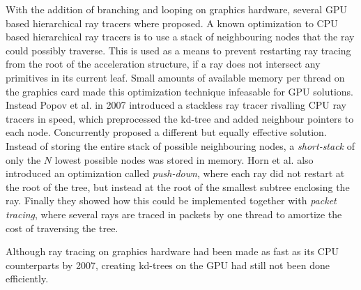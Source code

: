 With the addition of branching and looping on graphics hardware, several GPU
based hierarchical ray tracers where proposed. A known optimization to CPU based
hierarchical ray tracers is to use a stack of neighbouring nodes that the ray
could possibly traverse. This is used as a means to prevent restarting ray
tracing from the root of the acceleration structure, if a ray does not intersect
any primitives in its current leaf. Small amounts of available memory per thread
on the graphics card made this optimization technique infeasable for GPU
solutions. Instead Popov et al. in 2007 introduced a
stackless ray tracer rivalling CPU ray tracers in speed, which preprocessed the
kd-tree and added neighbour pointers to each node. Concurrently \horn{} proposed
a different but equally effective solution. Instead of storing the entire stack
of possible neighbouring nodes, a \textit{short-stack} of only the $N$ lowest
possible nodes was stored in memory. Horn et al. also introduced an optimization
called \textit{push-down}, where each ray did not restart at the root of the
tree, but instead at the root of the smallest subtree enclosing the ray. Finally
they showed how this could be implemented together with \textit{packet tracing},
where several rays are traced in packets by one thread to amortize the cost of
traversing the tree.




Although ray tracing on graphics hardware had been made as fast as its CPU
counterparts by 2007, creating kd-trees on the GPU had still not been done
efficiently.


